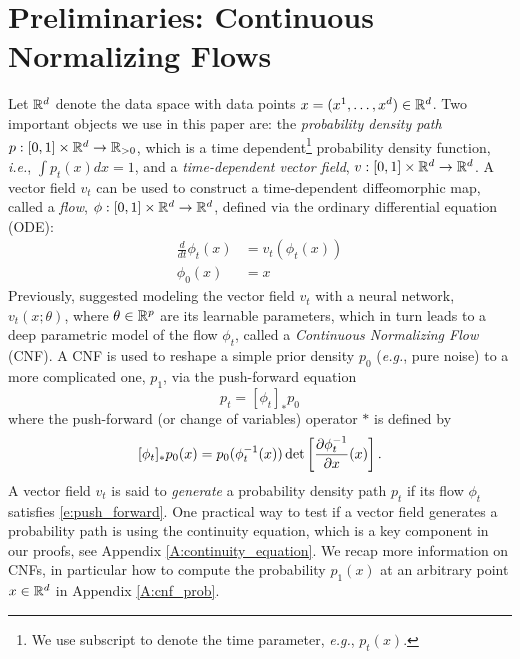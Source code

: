 \documentclass{article}
\makeatletter
\renewcommand*{\eg}{{\it e.g.}\@\xspace}
\renewcommand*{\ie}{{\it i.e.}\@\xspace}
\makeatother
\begin{document}
\section{Preliminaries: Continuous Normalizing Flows}
\label{s:prelim}
Let $\mathbb R^d$ denote the data space with data points $x=(x^1,\ldots,x^d) \in \mathbb R^d$. Two important objects we use in this paper are: the \emph{probability density path} $p:[0,1]\times \mathbb R^d \rightarrow \mathbb R_{>0}$, which is a time dependent\footnote{We use subscript to denote the time parameter, 
\eg, $p_t(x)$.} probability density function, \ie, $\int p_t(x)dx = 1$, and a \emph{time-dependent vector field}, $v:[0,1]\times \mathbb R^d \rightarrow \mathbb R^d$. A vector field $v_t$ can be used to construct a time-dependent diffeomorphic map, called a \emph{flow}, $\phi:[0,1]\times \mathbb R^d \rightarrow \mathbb R^d$, defined via the ordinary differential equation (ODE):
\begin{align}\label{e:ode}
    \frac{d}{dt}\phi_t(x) &= v_t(\phi_t(x)) \\
    \phi_0(x) &= x
\end{align}
Previously, \cite{chen2018neural} suggested modeling the vector field $v_t$ with a neural network, $v_t(x;\theta)$, where $\theta\in \mathbb R^p$ are its learnable parameters, which in turn leads to a deep parametric model of the flow $\phi_t$, called a \emph{Continuous Normalizing Flow} (CNF). A CNF is used to reshape a simple prior density $p_0$ (\eg, pure noise) to a more complicated one, $p_1$, via the push-forward equation
\begin{equation}\label{e:push_forward}
p_t = [\phi_t]_* p_0
\end{equation}
where the push-forward (or change of variables) operator $*$ is defined by
\begin{equation}\label{e:push_forward_explicit}
    [\phi_t]_* p_0(x) = p_0(\phi_t^{-1}(x))\det \left [ \frac{\partial \phi_t^{-1}}{\partial x}(x)\right ].
\end{equation}
A vector field $v_t$ is said to \emph{generate} a probability density path $p_t$ if its flow $\phi_t$ satisfies \eqref{e:push_forward}. One practical way to test if a vector field generates a probability path is using the continuity equation, which is a key component in our proofs, see Appendix \ref{A:continuity_equation}. We recap more information on CNFs, in particular how to compute the probability $p_1(x)$ at an arbitrary point $x\in\mathbb R^d$ in Appendix \ref{A:cnf_prob}. 
\end{document}
